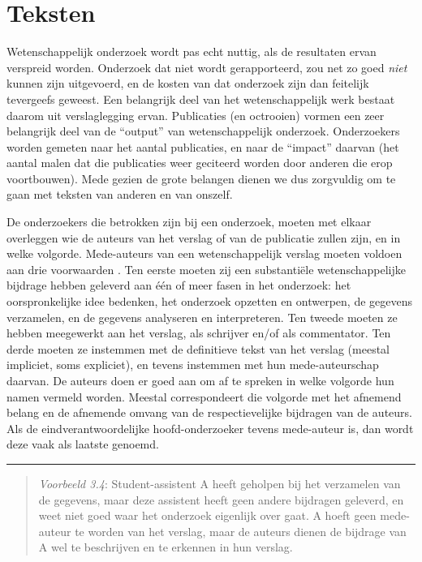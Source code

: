 \documentclass[
]{book}
\begin{document}
\hypertarget{teksten}{%
\section{Teksten}\label{teksten}}

Wetenschappelijk onderzoek wordt pas echt nuttig, als de resultaten
ervan verspreid worden. Onderzoek dat niet wordt gerapporteerd, zou net
zo goed \emph{niet} kunnen zijn uitgevoerd, en de kosten van dat onderzoek
zijn dan feitelijk tevergeefs geweest. Een belangrijk deel van het
wetenschappelijk werk bestaat daarom uit verslaglegging ervan.
Publicaties (en octrooien) vormen een zeer belangrijk deel van de
``output'' van wetenschappelijk onderzoek. Onderzoekers worden gemeten
naar het aantal publicaties, en naar de ``impact'' daarvan (het aantal
malen dat die publicaties weer geciteerd worden door anderen die erop
voortbouwen). Mede gezien de grote belangen dienen we dus zorgvuldig om
te gaan met teksten van anderen en van onszelf.

De onderzoekers die betrokken zijn bij een onderzoek, moeten met elkaar
overleggen wie de auteurs van het verslag of van de publicatie zullen
zijn, en in welke volgorde. Mede-auteurs van een wetenschappelijk
verslag moeten voldoen aan drie voorwaarden \citep[Ch.10]{ORI12}. Ten eerste
moeten zij een substantiële wetenschappelijke bijdrage hebben geleverd
aan één of meer fasen in het onderzoek: het oorspronkelijke idee
bedenken, het onderzoek opzetten en ontwerpen, de gegevens verzamelen,
en de gegevens analyseren en interpreteren. Ten tweede moeten ze hebben
meegewerkt aan het verslag, als schrijver en/of als commentator. Ten
derde moeten ze instemmen met de definitieve tekst van het verslag
(meestal impliciet, soms expliciet), en tevens instemmen met hun
mede-auteurschap daarvan. De auteurs doen er goed aan om af te spreken
in welke volgorde hun namen vermeld worden. Meestal correspondeert die
volgorde met het afnemend belang en de afnemende omvang van de
respectievelijke bijdragen van de auteurs. Als de eindverantwoordelijke
hoofd-onderzoeker tevens mede-auteur is, dan wordt deze vaak als laatste
genoemd.

\begin{center}\rule{0.5\linewidth}{0.5pt}\end{center}

\begin{quote}
\emph{Voorbeeld 3.4}:
Student-assistent A heeft geholpen bij het verzamelen van de gegevens,
maar deze assistent heeft geen andere bijdragen geleverd, en weet niet
goed waar het onderzoek eigenlijk over gaat. A hoeft geen mede-auteur te
worden van het verslag, maar de auteurs dienen de bijdrage van A wel te
beschrijven en te erkennen in hun verslag.
\end{quote}
\end{document}
